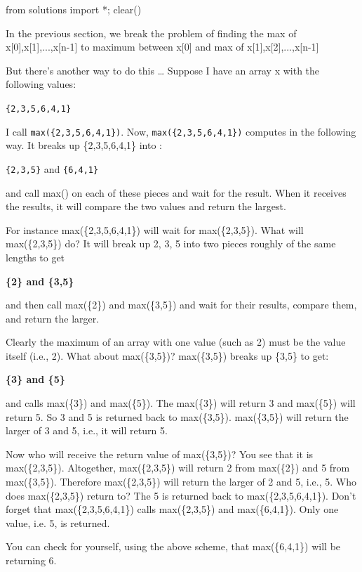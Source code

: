 \begin{python0}
from solutions import *; clear()
\end{python0}

In the previous section, we break the problem of finding the max of x[0],x[1],...,x[n-1] to maximum between x[0] and max of x[1],x[2],...,x[n-1]

But there's another way to do this \ldots{} Suppose I have an array x with the following values:

\verb!{2,3,5,6,4,1}!

I call \verb!max({2,3,5,6,4,1})!. Now, \verb!max({2,3,5,6,4,1})! computes in the following way. It breaks up \{2,3,5,6,4,1\} into :

\verb!{2,3,5}! and \verb!{6,4,1}!

and call max() on each of these pieces and wait for the result. When it receives the results, it will compare the two values and return the largest.

For instance max(\{2,3,5,6,4,1\}) will wait for max(\{2,3,5\}). What will max(\{2,3,5\}) do? It will break up 2, 3, 5 into two pieces roughly of the same lengths to get

\textbf{\{2\} and \{3,5\}}

and then call max(\{2\}) and max(\{3,5\}) and wait for their results, compare them, and return the larger.

Clearly the maximum of an array with one value (such as 2) must be the value itself (i.e., 2). What about max(\{3,5\})? max(\{3,5\}) breaks up \{3,5\} to get:

\textbf{\{3\} and \{5\}}

and calls max(\{3\}) and max(\{5\}). The max(\{3\}) will return 3 and
max(\{5\}) will return 5. So 3 and 5 is returned back to max(\{3,5\}).
max(\{3,5\}) will return the larger of 3 and 5, i.e., it will return 5.

Now who will receive the return value of max(\{3,5\})? You see that it
is max(\{2,3,5\}). Altogether, max(\{2,3,5\}) will return 2 from
max(\{2\}) and 5 from max(\{3,5\}). Therefore max(\{2,3,5\}) will return
the larger of 2 and 5, i.e., 5. Who does max(\{2,3,5\}) return to? The 5
is returned back to max(\{2,3,5,6,4,1\}). Don't forget
that max(\{2,3,5,6,4,1\}) calls max(\{2,3,5\}) and max(\{6,4,1\}). Only
one value, i.e. 5, is returned.

You can check for yourself, using the above scheme, that max(\{6,4,1\}) will be returning 6.

